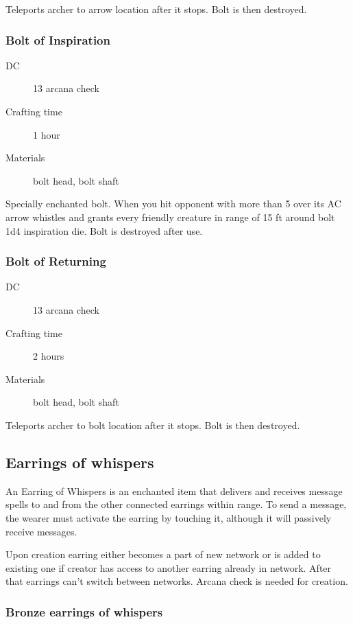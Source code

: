 Teleports archer to arrow location after it stops. Bolt is then destroyed.

\subsubsection{Bolt of Inspiration}

\begin{description}
\item [DC] 13 arcana check
\item [Crafting time] 1 hour
\item [Materials] bolt head, bolt shaft
\end{description}

Specially enchanted bolt. When you hit opponent with more than 5 over its AC arrow whistles and grants every friendly creature in range of 15 ft around bolt 1d4 inspiration die. Bolt is destroyed after use.

\subsubsection{Bolt of Returning}

\begin{description}
\item [DC] 13 arcana check
\item [Crafting time] 2 hours
\item [Materials] bolt head, bolt shaft
\end{description}

Teleports archer to bolt location after it stops. Bolt is then destroyed.

\subsection{Earrings of whispers}

An Earring of Whispers is an enchanted item that delivers and receives message spells to and from the other connected earrings within range. To send a message, the wearer must activate the earring by touching it, although it will passively receive messages.

Upon creation earring either becomes a part of new network or is added to existing one if creator has access to another earring already in network. After that earrings can't switch between networks. Arcana check is needed for creation.

\subsubsection{Bronze earrings of whispers}

